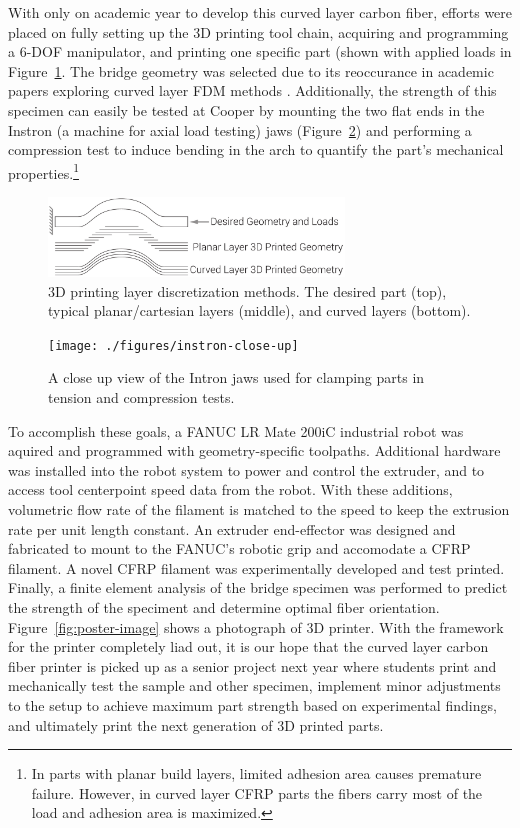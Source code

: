 With only on academic year to develop this curved layer carbon fiber, efforts were placed on fully setting up the 3D printing tool chain, acquiring and programming a 6-DOF manipulator, and printing one specific part (shown with applied loads in Figure~\ref{fig:intro-layers-geometry-loads}. The bridge geometry was selected due to its reoccurance in academic papers exploring curved layer FDM methods \cite{cute-curves}. Additionally, the strength of this specimen can easily be tested at Cooper by mounting the two flat ends in the Instron (a machine for axial load testing) jaws (Figure~\ref{fig:instron-close-up}) and performing a compression test to induce bending in the arch to quantify the part's mechanical properties.\footnote{In parts with planar build layers, limited adhesion area causes premature failure. However, in curved layer CFRP parts the fibers carry most of the load and adhesion area is maximized.}\\

\begin{figure}[h!]
\centering
\includegraphics[width=0.7\textwidth]{./figures/intro-layers-geometry-loads}
\caption{3D printing layer discretization methods. The desired part (top), typical planar/cartesian layers (middle), and curved layers (bottom).}
\label{fig:intro-layers-geometry-loads}
\end{figure}

\begin{figure}[h!]
\centering
\texttt{[image: ./figures/instron-close-up]}
\caption{A close up view of the Intron jaws used for clamping parts in tension and compression tests.}
\label{fig:instron-close-up}
\end{figure}

To accomplish these goals, a FANUC LR Mate 200iC industrial robot was aquired and programmed with geometry-specific toolpaths. Additional hardware was installed into the robot system to power and control the extruder, and to access tool centerpoint speed data from the robot. With these additions, volumetric flow rate of the filament is matched to the speed to keep the extrusion rate per unit length constant. An extruder end-effector was designed and fabricated to mount to the FANUC's robotic grip and accomodate a CFRP filament. A novel CFRP filament was experimentally developed and test printed. Finally, a finite element analysis of the bridge specimen was performed to predict the strength of the speciment and determine optimal fiber orientation. Figure~\ref{fig:poster-image} shows a photograph of 3D printer. With the framework for the printer completely liad out, it is our hope that the curved layer carbon fiber printer is picked up as a senior project next year where students print and mechanically test the sample and other specimen, implement minor adjustments to the setup to achieve maximum part strength based on experimental findings, and ultimately print the next generation of 3D printed parts.\\

